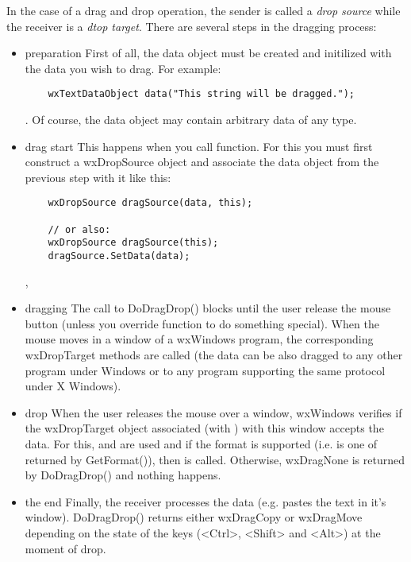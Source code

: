In the case of a drag and drop operation, the sender is called a {\it drop
source} while the receiver is a {\it dtop target}. There are several steps in
the dragging process:
\begin{itemize}\itemsep=0pt
\item{preparation} First of all, the data object must be created and
initilized with the data you wish to drag. For example:
\begin{verbatim}
	wxTextDataObject data("This string will be dragged.");
\end{verbatim}. Of course, the data object may contain arbitrary data of any
type.
\item{drag start} This happens when you call
 function. For this you must first
construct a wxDropSource object and associate the data object from the
previous step with it like this:
\begin{verbatim}
	wxDropSource dragSource(data, this);

	// or also:
	wxDropSource dragSource(this);
	dragSource.SetData(data);
\end{verbatim},
\item{dragging} The call to DoDragDrop() blocks until the user release the
mouse button (unless you override
 function to do something
special). When the mouse moves in a window of a wxWindows program, the
corresponding wxDropTarget methods are called (the data can be also dragged to
any other program under Windows or to any program supporting the same protocol
under X Windows).
\item{drop} When the user releases the mouse over a window, wxWindows verifies
if the wxDropTarget object associated (with
) with this window accepts the data. For
this,  and
 are used and if the format is
supported (i.e. is one of returned by GetFormat()), then
 is called. Otherwise, wxDragNone is
returned by DoDragDrop() and nothing happens.
\item{the end} Finally, the receiver processes the data (e.g. pastes the text
in it's window). DoDragDrop() returns either wxDragCopy or wxDragMove
depending on the state of the keys (<Ctrl>, <Shift> and <Alt>) at the moment
of drop.
\end{itemize}

